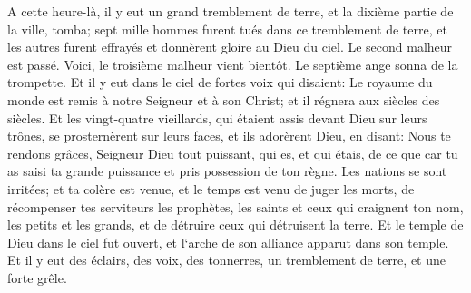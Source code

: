 \verse A cette heure-là, il y eut un grand tremblement de terre, et la dixième partie de la ville, tomba; sept mille hommes furent tués dans ce tremblement de terre, et les autres furent effrayés et donnèrent gloire au Dieu du ciel. 
\verse Le second malheur est passé. Voici, le troisième malheur vient bientôt. 
\verse Le septième ange sonna de la trompette. Et il y eut dans le ciel de fortes voix qui disaient: Le royaume du monde est remis à notre Seigneur et à son Christ; et il régnera aux siècles des siècles. 
\verse Et les vingt-quatre vieillards, qui étaient assis devant Dieu sur leurs trônes, se prosternèrent sur leurs faces, et ils adorèrent Dieu, 
\verse en disant: Nous te rendons grâces, Seigneur Dieu tout puissant, qui es, et qui étais, de ce que car tu as saisi ta grande puissance et pris possession de ton règne. 
\verse Les nations se sont irritées; et ta colère est venue, et le temps est venu de juger les morts, de récompenser tes serviteurs les prophètes, les saints et ceux qui craignent ton nom, les petits et les grands, et de détruire ceux qui détruisent la terre. 
\verse Et le temple de Dieu dans le ciel fut ouvert, et l`arche de son alliance apparut dans son temple. Et il y eut des éclairs, des voix, des tonnerres, un tremblement de terre, et une forte grêle. 

